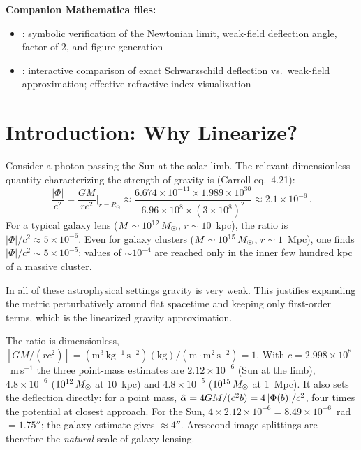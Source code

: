 \medskip
\noindent
\textbf{Companion Mathematica files:}
\begin{itemize}[nosep]
    \item {}:
          symbolic verification of the Newtonian limit, weak-field
          deflection angle, factor-of-2, and figure generation
    \item {}:
          interactive comparison of exact Schwarzschild deflection
          vs.\ weak-field approximation; effective refractive index
          visualization
\end{itemize}


\section{Introduction: Why Linearize?}
\label{sec:why_linearize}

Consider a photon passing the Sun at the solar limb.  The relevant
dimensionless quantity characterizing the strength of gravity is
(Carroll eq.~4.21):
\begin{equation}
    \frac{|\Phi|}{c^2} = \frac{GM}{rc^2} \bigg|_{r = R_\odot}
    \approx \frac{6.674 \times 10^{-11} \times 1.989 \times 10^{30}}
    {6.96 \times 10^{8} \times (3 \times 10^{8})^2}
    \approx 2.1 \times 10^{-6} \,.
    \label{eq:sun_potential}
\end{equation}
For a typical galaxy lens ($M \sim 10^{12}\,M_{\odot}$, $r \sim 10$~kpc),
the ratio is $|\Phi|/c^2 \approx 5 \times 10^{-6}$.  Even for
galaxy clusters ($M \sim 10^{15}\,M_{\odot}$, $r \sim 1$~Mpc), one finds
$|\Phi|/c^2 \sim 5 \times 10^{-5}$; values of $\sim 10^{-4}$ are reached
only in the inner few hundred kpc of a massive cluster.

In all of these astrophysical settings gravity is very
weak.  This justifies expanding the metric perturbatively around flat
spacetime and keeping only first-order terms, which is the linearized
gravity approximation.

\begin{annotation}
The ratio is dimensionless, $[GM/(rc^2)] =
(\mathrm{m^3\,kg^{-1}\,s^{-2}})(\mathrm{kg})/
(\mathrm{m}\cdot\mathrm{m^2\,s^{-2}}) = 1$.  With
$c = 2.998\times10^8$~m\,s$^{-1}$ the three point-mass estimates are
$2.12\times10^{-6}$ (Sun at the limb), $4.8\times10^{-6}$
($10^{12}\,M_{\odot}$ at 10~kpc) and $4.8\times10^{-5}$
($10^{15}\,M_{\odot}$ at 1~Mpc).
It also sets the deflection directly: for a point mass,
$\hat{\alpha} = 4GM/(c^2b) = 4\,|\Phi(b)|/c^2$, four times the
potential at closest approach.  For the Sun, $4\times2.12\times10^{-6} =
8.49\times10^{-6}$~rad $= 1.75''$; the galaxy estimate gives
$\approx 4''$.  Arcsecond image splittings are therefore the
\emph{natural} scale of galaxy lensing.
\end{annotation}


